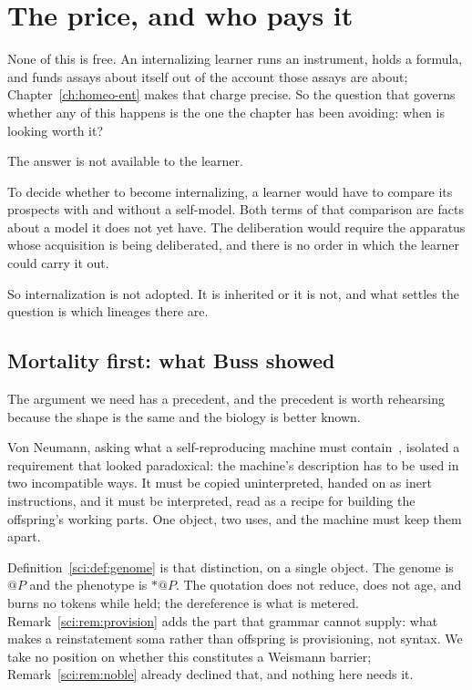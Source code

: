 \section{The price, and who pays it}
\label{suf:S5}

None of this is free.
An internalizing learner runs an instrument, holds a formula, and funds
assays about itself out of the account those assays are about;
Chapter~\ref{ch:homeo-ent} makes that charge precise.
So the question that governs whether any of this happens is the one the
chapter has been avoiding: when is looking worth it?

The answer is not available to the learner.

\begin{remark}
\label{suf:rem:no-decision}
To decide whether to become internalizing, a learner would have to
compare its prospects with and without a self-model.
Both terms of that comparison are facts about a model it does not yet
have.
The deliberation would require the apparatus whose acquisition is being
deliberated, and there is no order in which the learner could carry it
out.

So internalization is not adopted.
It is inherited or it is not, and what settles the question is which
lineages there are.
\end{remark}

\subsection{Mortality first: what Buss showed}
\label{suf:S5.1}

The argument we need has a precedent, and the precedent is worth
rehearsing because the shape is the same and the biology is better known.

Von Neumann, asking what a self-reproducing machine must
contain~\cite{vonneumann1966}, isolated
a requirement that looked paradoxical: the machine's description has to be
used in two incompatible ways.
It must be copied uninterpreted, handed on as inert instructions, and it
must be interpreted, read as a recipe for building the offspring's working
parts.
One object, two uses, and the machine must keep them apart.

Definition~\ref{sci:def:genome} is that distinction, on a single object.
The genome is $@P$ and the phenotype is $\ast @P$.
The quotation does not reduce, does not age, and burns no tokens while
held; the dereference is what is metered.
Remark~\ref{sci:rem:provision} adds the part that grammar cannot supply:
what makes a reinstatement soma rather than offspring is provisioning, not
syntax.
We take no position on whether this constitutes a Weismann barrier;
Remark~\ref{sci:rem:noble} already declined that, and nothing here needs
it.

